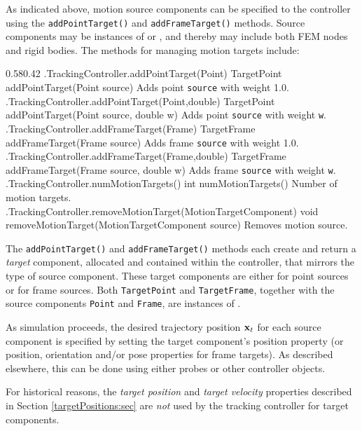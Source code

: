 As indicated above, motion source components can be specified to the controller
using the {\tt addPointTarget()} and {\tt addFrameTarget()} methods. Source
components may be instances of 
or , and thereby may include both FEM nodes and rigid
bodies. The methods for managing motion targets include:
%
\begin{methodtable}{0.58}{0.42}
\midline
%
\methodentry
{\inverse.TrackingController.addPointTarget(Point)}%
{TargetPoint addPointTarget(Point source)}%
{Adds point {\tt source} with weight 1.0.}%
%
\methodentry
{\inverse.TrackingController.addPointTarget(Point,double)}%
{TargetPoint addPointTarget(Point source, double w)}%
{Adds point {\tt source} with weight {\tt w}.}%
%
\methodentry
{\inverse.TrackingController.addFrameTarget(Frame)}%
{TargetFrame addFrameTarget(Frame source)}%
{Adds frame {\tt source} with weight 1.0.}%
%
\methodentry
{\inverse.TrackingController.addFrameTarget(Frame,double)}%
{TargetFrame addFrameTarget(Frame source, double w)}%
{Adds frame {\tt source} with weight {\tt w}.}%
%
\methodspace{0.5em}
%
\methodentry
{\inverse.TrackingController.numMotionTargets()}%
{int numMotionTargets()}%
{Number of motion targets.}%
%
\methodentry
{\inverse.TrackingController.removeMotionTarget(MotionTargetComponent)}%
{void removeMotionTarget(MotionTargetComponent source)}%
{Removes motion source.}%
%
\midline
\end{methodtable}
%

The {\tt addPointTarget()} and {\tt addFrameTarget()} methods each create and
return a {\it target} component, allocated and contained within the controller,
that mirrors the type of source component.  These target components are
either  for point sources or
 for frame sources.
Both {\tt TargetPoint} and {\tt TargetFrame}, together with the source
components {\tt Point} and {\tt Frame}, are instances of
.

As simulation proceeds, the desired trajectory position ${\bf x}_t$ for each source
component is specified by setting the target component's {\sf position}
property (or {\sf position}, {\sf orientation} and/or {\sf pose} properties for
frame targets). As described elsewhere, this can be done using either probes
or other controller objects.

\begin{sideblock}
For historical reasons, the {\it target position} and {\it target velocity}
properties described in Section \ref{targetPositions:sec} are {\it not} used by
the tracking controller for target components.
\end{sideblock}

